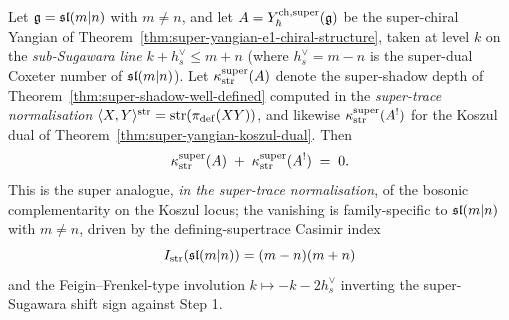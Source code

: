 \begin{theorem}
\label{thm:super-complementarity-supertrace-zero}
Let $\mathfrak{g} = \mathfrak{sl}(m|n)$ with $m\neq n$, and let $A = Y^{\mathrm{ch},\mathrm{super}}_{\hbar}(\mathfrak{g})$
be the super-chiral Yangian of
Theorem~\ref{thm:super-yangian-e1-chiral-structure}, taken at level $k$
on the \emph{sub-Sugawara line} $k+h^{\vee}_{s}\le m+n$ (where
$h^{\vee}_{s}= m-n$ is the super-dual Coxeter number of $\mathfrak{sl}(m|n)$).
Let $\kappa^{\mathrm{super}}_{\operatorname{str}}(A)$ denote the super-shadow depth
of Theorem~\ref{thm:super-shadow-well-defined} computed in the
\emph{super-trace normalisation}
$\langle X,Y\rangle^{\operatorname{str}}=\operatorname{str}(\pi_{\mathrm{def}}(XY))$, and likewise
$\kappa^{\mathrm{super}}_{\operatorname{str}}(A^{!})$ for the Koszul dual of
Theorem~\ref{thm:super-yangian-koszul-dual}. Then
\begin{equation}
 \label{eq:super-complementarity-supertrace}
 \kappa^{\mathrm{super}}_{\operatorname{str}}(A) \;+\;
 \kappa^{\mathrm{super}}_{\operatorname{str}}(A^{!})
 \;=\;
 0.
\end{equation}
This is the super analogue, \emph{in the super-trace normalisation},
of the bosonic complementarity on the Koszul locus; the vanishing is
family-specific to $\mathfrak{sl}(m|n)$ with $m\neq n$, driven by the
defining-supertrace Casimir index
\[
 I_{\operatorname{str}}(\mathfrak{sl}(m|n))=(m-n)(m+n)
\]
and the
Feigin--Frenkel-type involution $k\mapsto -k-2h^{\vee}_{s}$ inverting
the super-Sugawara shift sign against Step 1.
\end{theorem}

